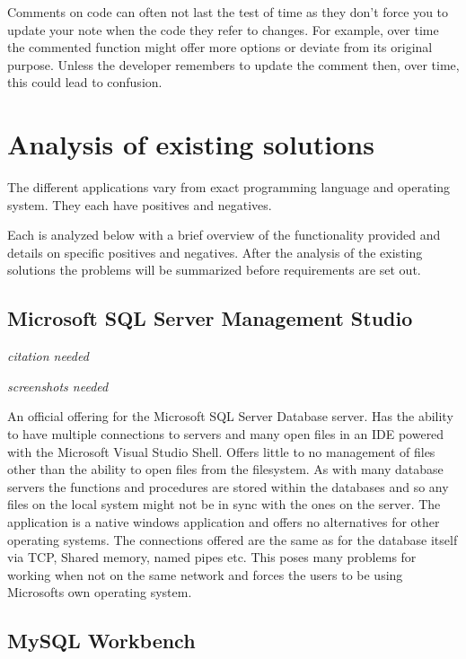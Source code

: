Comments on code can often not last the test of time as they don't force you to
update your note when the code they refer to changes. For example, over time the
commented function might offer more options or deviate from its original
purpose. Unless the developer remembers to update the comment then, over time, this could lead to confusion.

\section{Analysis of existing solutions}\label{analysis-of-existing-solutions}

The different applications vary from exact programming language and
operating system. They each have positives and negatives.

Each is analyzed below with a brief overview of the functionality provided and details on specific positives and negatives. After the analysis of the existing solutions the problems will be summarized before requirements are set out.

\subsection{Microsoft SQL Server Management Studio}\label{microsoft-sql-server-management-studio}

\emph{citation needed}

\emph{screenshots needed}

An official offering for the Microsoft SQL Server Database server. Has
the ability to have multiple connections to servers and many open files
in an IDE powered with the Microsoft Visual Studio Shell. Offers little
to no management of files other than the ability to open files from the
filesystem. As with many database servers the functions and procedures
are stored within the databases and so any files on the local system
might not be in sync with the ones on the server. The application is a
native windows application and offers no alternatives for other
operating systems. The connections offered are the same as for the
database itself via TCP, Shared memory, named pipes etc. This poses many
problems for working when not on the same network and forces the users
to be using Microsofts own operating system.

\subsection{MySQL Workbench}\label{mysql-workbench}

